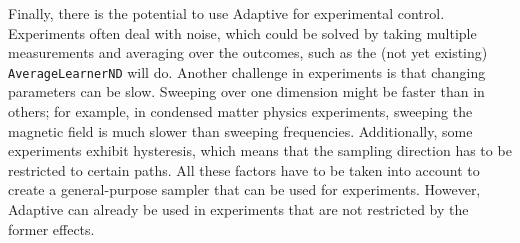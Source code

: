 
Finally, there is the potential to use Adaptive for experimental control.
Experiments often deal with noise, which could be solved by taking multiple measurements and averaging over the outcomes, such as the (not yet existing) \passthrough{\lstinline!AverageLearnerND!} will do.
Another challenge in experiments is that changing parameters can be slow.
Sweeping over one dimension might be faster than in others; for example, in condensed matter physics experiments, sweeping the magnetic field is much slower than sweeping frequencies.
Additionally, some experiments exhibit hysteresis, which means that the sampling direction has to be restricted to certain paths.
All these factors have to be taken into account to create a general-purpose sampler that can be used for experiments.
However, Adaptive can already be used in experiments that are not restricted by the former effects.

